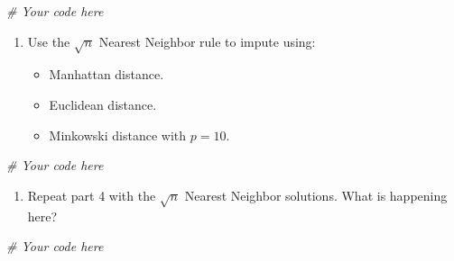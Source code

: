 \documentclass[]{article}
\newenvironment{Shaded}{\begin{snugshade}}{\end{snugshade}}
\newcommand{\CommentTok}[1]{\textcolor[rgb]{0.56,0.35,0.01}{\textit{#1}}}
\providecommand{\tightlist}{%
  \setlength{\itemsep}{0pt}\setlength{\parskip}{0pt}}
\begin{document}
\begin{Shaded}
\begin{Highlighting}[]
\CommentTok{# Your code here}
\end{Highlighting}
\end{Shaded}

\begin{enumerate}
\def\labelenumi{\arabic{enumi}.}
\setcounter{enumi}{4}
\tightlist
\item
  Use the \(\sqrt{n}\) Nearest Neighbor rule to impute using:

  \begin{itemize}
  \tightlist
  \item
    Manhattan distance.
  \item
    Euclidean distance.
  \item
    Minkowski distance with \(p = 10\).
  \end{itemize}
\end{enumerate}

\begin{Shaded}
\begin{Highlighting}[]
\CommentTok{# Your code here}
\end{Highlighting}
\end{Shaded}

\begin{enumerate}
\def\labelenumi{\arabic{enumi}.}
\setcounter{enumi}{5}
\tightlist
\item
  Repeat part 4 with the \(\sqrt{n}\) Nearest Neighbor solutions. What
  is happening here?
\end{enumerate}

\begin{Shaded}
\begin{Highlighting}[]
\CommentTok{# Your code here}
\end{Highlighting}
\end{Shaded}
\end{document}
